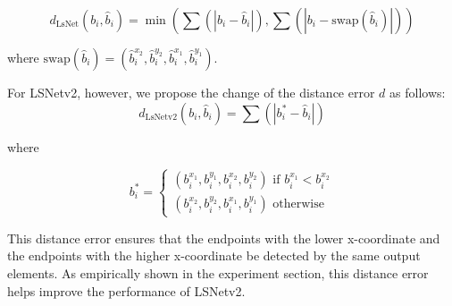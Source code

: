 \documentclass[journal]{IEEEtran}
\newcommand{\commentM}[1]{\textbf{\textcolor{blue}{M: #1}}}
\begin{document}
\begin{equation}
  d_{\text{LsNet}}(b_i, \hat{b}_i) = \min(\sum (|b_i - \hat{b}_i|), \sum(|b_i - \text{swap}(\hat{b}_i)|))
\end{equation}

where $\text{swap}(\hat{b}_i) = (\hat{b}_i^{x_2}, \hat{b}_i^{y_2}, \hat{b}_i^{x_1}, \hat{b}_i^{y_1})$.

For LSNetv2, however, we propose the change of the distance error $d$ as follows:
\begin{equation}
  d_{\text{LsNetv2}}(b_i, \hat{b}_i) = \sum (|b^*_i - \hat{b}_i|)
\end{equation}

where 

\begin{equation}
  b^*_i=
    \begin{cases}
       (b_i^{x_1}, b_i^{y_1}, b_i^{x_2}, b_i^{y_2}) \text{ if } b_i^{x_1} < b_i^{x_2} \\
       (b_i^{x_2}, b_i^{y_2}, b_i^{x_1}, b_i^{y_1}) \text{ otherwise }
    \end{cases}       
\end{equation}

This distance error ensures that the endpoints with the lower x-coordinate and the endpoints with the higher x-coordinate be detected by the same output elements. As empirically shown in the experiment section, this distance error helps improve the performance of LSNetv2. 




\end{document}
